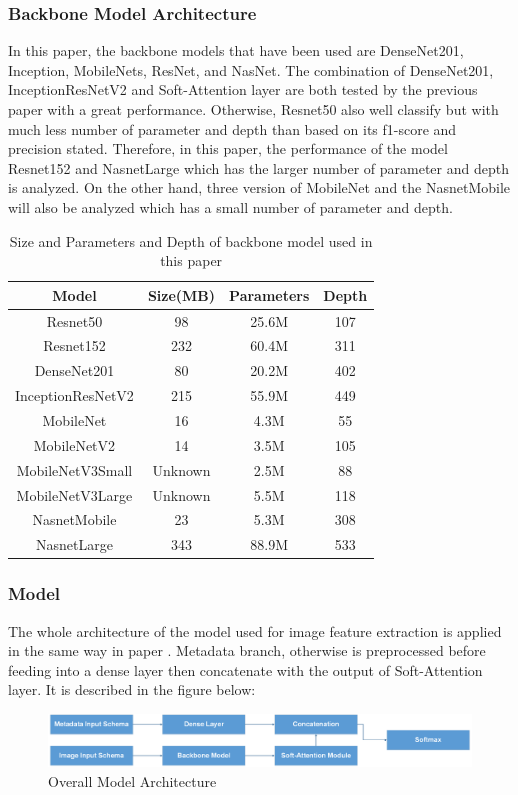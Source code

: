 \subsubsection{Backbone Model Architecture}
In this paper, the backbone models that have been used are DenseNet201\cite{06993}, Inception\cite{00567}, MobileNets\cite{04861}\cite{04381}\cite{02244}, ResNet\cite{03385}\cite{05027}, and NasNet\cite{07012}. The combination of DenseNet201, InceptionResNetV2 and Soft-Attention layer are both tested by the previous paper\cite{03358} with a great performance. Otherwise, Resnet50 also well classify but with much less number of parameter and depth than based on its f1-score and precision stated. Therefore, in this paper, the performance of the model Resnet152 and NasnetLarge which has the larger number of parameter and depth is analyzed. On the other hand, three version of MobileNet and the NasnetMobile will also be analyzed which has a small number of parameter and depth.  
\FloatBarrier
\begin{table}[ht]
	\centering
	\begin{tabular}{|c | c c c|} 
		\hline
		Model & Size(MB) & Parameters & Depth \\ 
		\hline
		Resnet50 & 98 & 25.6M & 107 \\ 
		\hline
		Resnet152 & 232 & 60.4M & 311 \\ 
		\hline
		DenseNet201 & 80 & 20.2M & 402 \\
		\hline
		InceptionResNetV2 & 215 & 55.9M & 449 \\
		\hline
		MobileNet & 16 & 4.3M & 55 \\ 
		\hline
		MobileNetV2 & 14 & 3.5M & 105 \\ 
		\hline
		MobileNetV3Small & Unknown & 2.5M & 88 \\ 
		\hline
		MobileNetV3Large & Unknown & 5.5M & 118 \\
		\hline
		NasnetMobile & 23 & 5.3M & 308 \\
		\hline
		NasnetLarge & 343 & 88.9M & 533 \\ 
		\hline
	\end{tabular}
\caption{Size and Parameters and Depth of backbone model used in this paper}
\label{table:2}
\end{table}
\FloatBarrier

\subsubsection{Model}
The whole architecture of the model used for image feature extraction is applied in the same way in paper \cite{03358}. Metadata branch, otherwise is preprocessed before feeding into a dense layer then concatenate with the output of Soft-Attention layer. It is described in the figure below:
\begin{figure}[h]
	\centering
	\includegraphics[width=1\linewidth]{Diagram/MainModel}
	\caption{Overall Model Architecture}
	\label{fig:mainmodel}
\end{figure}

